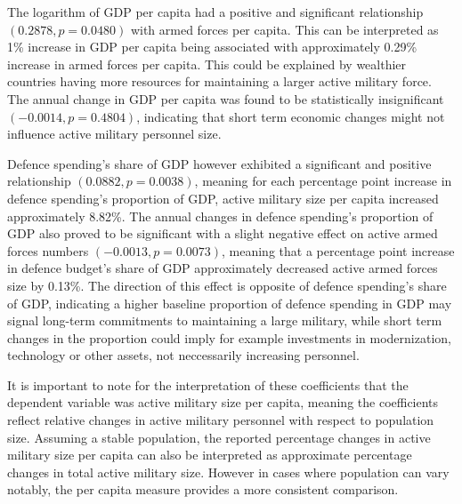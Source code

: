 The logarithm of GDP per capita had a positive and significant relationship $(0.2878, p=0.0480)$ 
with armed forces per capita. This can be interpreted as 1\% increase in GDP per capita being 
associated with approximately 0.29\% increase in armed forces per capita. This could be explained 
by wealthier countries having more resources for maintaining a larger active military force.
The annual change in GDP per capita was found to be 
statistically insignificant $(-0.0014, p=0.4804)$,
indicating that short term economic changes might not influence active military personnel size. 

Defence spending's share of GDP however exhibited 
a significant and positive relationship $(0.0882, p=0.0038)$, meaning for each percentage point increase in defence spending's 
proportion of GDP, active military size per capita increased approximately 8.82\%.
The annual changes in defence spending's proportion of GDP also proved to be significant with a slight negative effect 
on active armed forces numbers $(-0.0013, p=0.0073)$, meaning that a percentage point increase in defence 
budget's share of GDP approximately decreased active armed forces size by 0.13\%. The direction of 
this effect is opposite of defence spending's share of GDP, indicating a higher baseline proportion of defence 
spending in GDP may signal long-term commitments to maintaining a large military, while short term 
changes in the proportion could imply for example investments in modernization, technology or other 
assets, not neccessarily increasing personnel.

It is important to note for the interpretation of these coefficients that the dependent variable was 
active military size per capita, meaning the coefficients reflect relative changes in active military personnel 
with respect to population size. Assuming a stable population, the reported percentage changes 
in active military size per capita can also be interpreted as approximate percentage changes in total 
active military size. However in cases where population can vary notably, the per capita measure provides 
a more consistent comparison.

